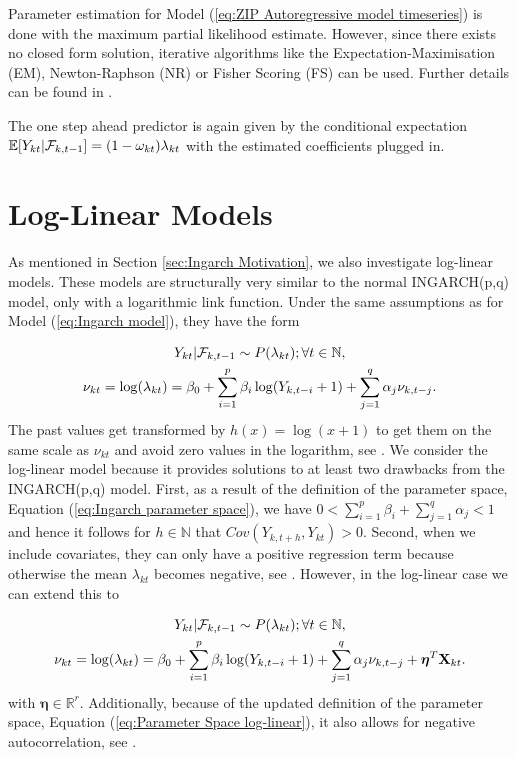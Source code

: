 Parameter estimation for Model (\ref{eq:ZIP Autoregressive model timeseries}) is done with the maximum partial likelihood estimate. However, since there exists no closed form solution, iterative algorithms like the Expectation-Maximisation (EM), Newton-Raphson (NR) or Fisher Scoring (FS) can be used.  Further details can be found in \textcite{Yang:2012}.

The one step ahead predictor is again given by the conditional expectation $\mathbb{E}[Y_{kt} | \mathcal{F}_{k,t-1}] = (1-\omega_{kt})\lambda_{kt} $ with the estimated coefficients plugged in. 

\section{Log-Linear Models}
\label{sec: Log-Linear Models}

As mentioned in Section \ref{sec:Ingarch Motivation}, we also investigate log-linear models. These models are structurally very similar to the normal INGARCH(p,q) model, only with a logarithmic link function. Under the same assumptions as for Model (\ref{eq:Ingarch model}), they have the form 

\begin{equation}
\begin{gathered}
Y_{kt} | \mathcal{F}_{k,t-1} \sim P(\lambda_{kt}); \forall t \in \mathbb{N}, \\
\nu_{kt}= \log(\lambda_{kt}) = \beta_0 + \sum_{i=1}^p\beta_i \log(Y_{k,t-i}+1) + \sum_{j=1}^q\alpha_j \nu_{k,t-j}.
\label{eq:Log-Linear model}
\end{gathered}
\end{equation}
%
The past values get transformed by $h(x)=\log(x+1)$ to get them on the same scale as $\nu_{kt}$ and avoid zero values in the logarithm, see \textcite{Liboschik:2016,Fokianos:2011}. We consider the log-linear model because it provides solutions to at least two drawbacks from the INGARCH(p,q) model. First, as a result of the definition of the parameter space, Equation (\ref{eq:Ingarch parameter space}), we have $0 < \sum_{i=1}^p\beta_i + \sum_{j=1}^q\alpha_j < 1$ and hence it follows for $h\in \mathbb{N}$ that $Cov(Y_{k,t+h},Y_{kt})>0$. Second, when we include covariates, they can only have a positive regression term because otherwise the mean $\lambda_{kt}$ becomes negative, see \textcite{Fokianos:2011}. However, in the log-linear case we can extend this to

\begin{equation}
\begin{gathered}
Y_{kt} | \mathcal{F}_{k,t-1} \sim P(\lambda_{kt}); \forall t \in \mathbb{N}, \\
\nu_{kt}= \log(\lambda_{kt}) = \beta_0 + \sum_{i=1}^p\beta_i \log(Y_{k,t-i}+1) + \sum_{j=1}^q\alpha_j \nu_{k,t-j} + \bm{\eta}^T\textbf{X}_{kt}.
\label{eq:Log-Linear model external factors}
\end{gathered}
\end{equation}
%
with $\bm{\eta} \in \mathbb{R}^r$. Additionally, because of the updated definition of the parameter space, Equation (\ref{eq:Parameter Space log-linear}), it also allows for negative autocorrelation, see \textcite{Liboschik:2016}. 

